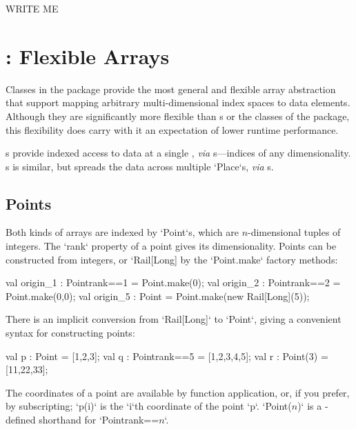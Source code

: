 WRITE ME

\section{: Flexible Arrays}

Classes in the  package provide the most general and 
flexible array abstraction that support mapping arbitrary multi-dimensional
index spaces to data elements. Although they are significantly more
flexible than s or the classes of the 
package, this flexibility does carry with it an expectation of lower
runtime performance. 

s provide indexed access to data at a single , {\em via}
s---indices of any dimensionality. s is similar, but
spreads the data across multiple \xcd`Place`s, {\em via} s.  

\subsection{Points}\label{point-syntax}

Both kinds of arrays are indexed by \xcd`Point`s, which are $n$-dimensional tuples of
integers.  The \xcd`rank`
property of a point gives its dimensionality.  Points can be constructed from
integers, or \xcd`Rail[Long] by the \xcd`Point.make` factory methods:
\begin{xten}
val origin_1 : Point{rank==1} = Point.make(0);
val origin_2 : Point{rank==2} = Point.make(0,0);
val origin_5 : Point = Point.make(new Rail[Long](5));
\end{xten}

There is an implicit conversion from \xcd`Rail[Long]` to 
\xcd`Point`, giving
a convenient syntax for constructing points: 

\begin{xten}
val p : Point = [1,2,3];
val q : Point{rank==5} = [1,2,3,4,5];
val r : Point(3) = [11,22,33];
\end{xten}

The coordinates of a point are available by function application, or, if you
prefer, by subscripting; \xcd`p(i)` is the
\xcd`i`th coordinate of the point \xcd`p`. 
\xcdmath`Point($n$)` is a -defined shorthand  for 
\xcdmath`Point{rank==$n$}`.


